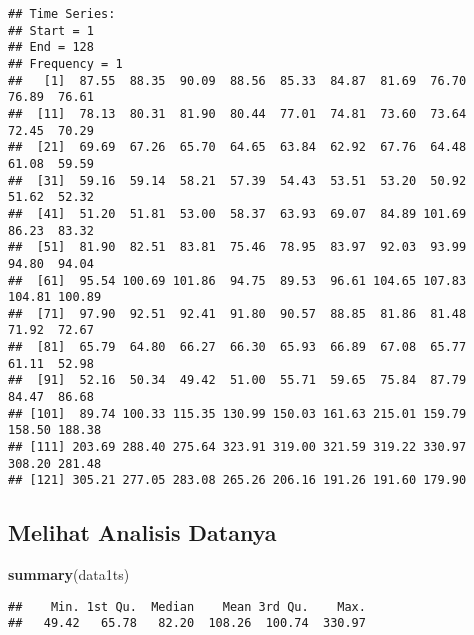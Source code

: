 \documentclass[
]{article}
\newenvironment{Shaded}{\begin{snugshade}}{\end{snugshade}}
\newcommand{\FunctionTok}[1]{\textcolor[rgb]{0.13,0.29,0.53}{\textbf{#1}}}
\newcommand{\NormalTok}[1]{#1}
\newcommand{\OtherTok}[1]{\textcolor[rgb]{0.56,0.35,0.01}{#1}}
\newcommand{\SpecialCharTok}[1]{\textcolor[rgb]{0.81,0.36,0.00}{\textbf{#1}}}
\newcommand{\StringTok}[1]{\textcolor[rgb]{0.31,0.60,0.02}{#1}}
\begin{document}
\begin{Shaded}
\end{Shaded}

\begin{verbatim}
## Time Series:
## Start = 1 
## End = 128 
## Frequency = 1 
##   [1]  87.55  88.35  90.09  88.56  85.33  84.87  81.69  76.70  76.89  76.61
##  [11]  78.13  80.31  81.90  80.44  77.01  74.81  73.60  73.64  72.45  70.29
##  [21]  69.69  67.26  65.70  64.65  63.84  62.92  67.76  64.48  61.08  59.59
##  [31]  59.16  59.14  58.21  57.39  54.43  53.51  53.20  50.92  51.62  52.32
##  [41]  51.20  51.81  53.00  58.37  63.93  69.07  84.89 101.69  86.23  83.32
##  [51]  81.90  82.51  83.81  75.46  78.95  83.97  92.03  93.99  94.80  94.04
##  [61]  95.54 100.69 101.86  94.75  89.53  96.61 104.65 107.83 104.81 100.89
##  [71]  97.90  92.51  92.41  91.80  90.57  88.85  81.86  81.48  71.92  72.67
##  [81]  65.79  64.80  66.27  66.30  65.93  66.89  67.08  65.77  61.11  52.98
##  [91]  52.16  50.34  49.42  51.00  55.71  59.65  75.84  87.79  84.47  86.68
## [101]  89.74 100.33 115.35 130.99 150.03 161.63 215.01 159.79 158.50 188.38
## [111] 203.69 288.40 275.64 323.91 319.00 321.59 319.22 330.97 308.20 281.48
## [121] 305.21 277.05 283.08 265.26 206.16 191.26 191.60 179.90
\end{verbatim}

\hypertarget{melihat-analisis-datanya}{%
\subsection{Melihat Analisis Datanya}\label{melihat-analisis-datanya}}

\begin{Shaded}
\begin{Highlighting}[]
\FunctionTok{summary}\NormalTok{(data1ts)}
\end{Highlighting}
\end{Shaded}

\begin{verbatim}
##    Min. 1st Qu.  Median    Mean 3rd Qu.    Max. 
##   49.42   65.78   82.20  108.26  100.74  330.97
\end{verbatim}
\end{document}
